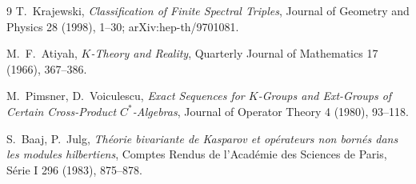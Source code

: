 \begin{thebibliography}{9}
T.~Krajewski,
\emph{Classification of Finite Spectral Triples},
Journal of Geometry and Physics 28 (1998), 1--30;
arXiv:hep-th/9701081.

M.~F.~Atiyah,
\emph{$K$-Theory and Reality},
Quarterly Journal of Mathematics 17 (1966), 367--386.

M.~Pimsner, D.~Voiculescu,
\emph{Exact Sequences for $K$-Groups and Ext-Groups of Certain
Cross-Product $C^*$-Algebras},
Journal of Operator Theory 4 (1980), 93--118.

S.~Baaj, P.~Julg,
\emph{Théorie bivariante de Kasparov et opérateurs non bornés dans les
modules hilbertiens},
Comptes Rendus de l'Académie des Sciences de Paris, Série I 296 (1983),
875--878.
\end{thebibliography}